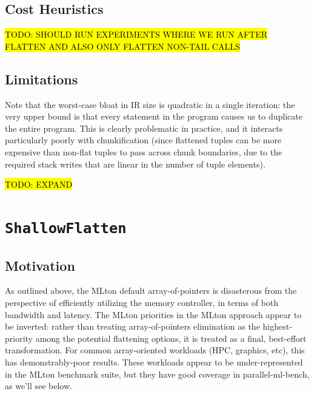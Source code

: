 \documentclass[leqno,11pt]{article}
\begin{document}
\subsection{Cost Heuristics}

\hl{TODO: SHOULD RUN EXPERIMENTS WHERE WE RUN AFTER FLATTEN AND ALSO ONLY
  FLATTEN NON-TAIL CALLS}



\subsection{Limitations}
Note that the worst-case bloat in IR size is quadratic in a single iteration:
the very upper bound is that every statement in the program causes us to
duplicate the entire program. This is clearly problematic in practice, and it
interacts particularly poorly with chunkification (since flattened tuples can be
more expensive than non-flat tuples to pass across chunk boundaries, due to the
required stack writes that are linear in the number of tuple elements).

\hl{TODO: EXPAND}

\section{\texttt{ShallowFlatten}}
\subsection{Motivation}
As outlined above, the MLton default array-of-pointers is disasterous from the
perspective of efficiently utilizing the memory controller, in terms of both
bandwidth and latency. The MLton priorities in the MLton approach appear to be
inverted: rather than treating array-of-pointers elimination as the
highest-priority among the potential flattening options, it is treated as a
final, best-effort transformation. For common array-oriented workloads (HPC,
graphics, etc), this has demonstrably-poor results. These workloads appear to be
under-represented in the MLton benchmark suite, but they have good coverage in
parallel-ml-bench, as we'll see below.
\end{document}
